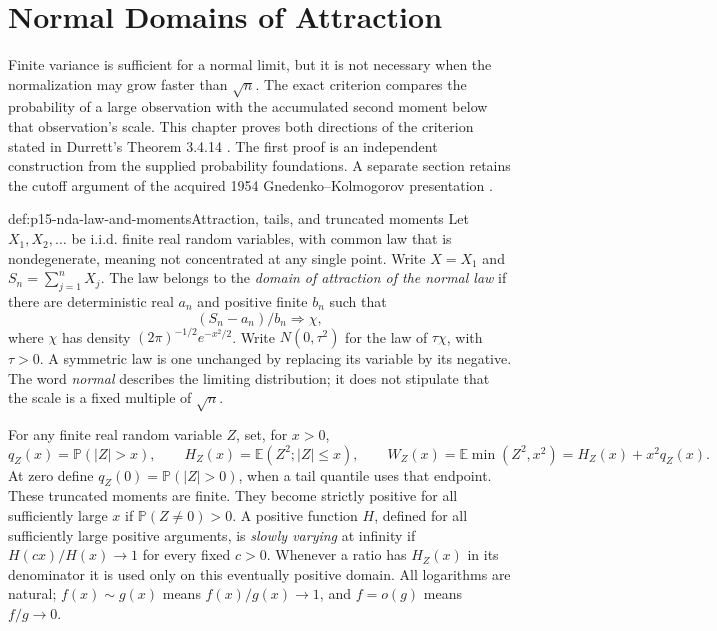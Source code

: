\chapter{Normal Domains of Attraction}
\label{sec:p15-normal-domains-of-attraction}

Finite variance is sufficient for a normal limit, but it is not
necessary when the normalization may grow faster than \(\sqrt n\).
The exact criterion compares the probability of a large observation
with the accumulated second moment below that observation's scale.
This chapter proves both directions of the criterion stated in
Durrett's Theorem 3.4.14
\cite[p.~152]{DurrettPTEAuthor2019}.
The first proof is an independent construction from the supplied
probability foundations. A separate section retains the cutoff
argument of the acquired 1954 Gnedenko--Kolmogorov presentation
\cite[Section~35, Theorem~1, pp.~172--175]{GnedenkoKolmogorov1954LimitDistributions}.

\begin{hbdefinition}{def:p15-nda-law-and-moments}{Attraction, tails, and truncated moments}
Let \(X_1,X_2,\ldots\) be i.i.d. finite real random variables,
with common law that is nondegenerate, meaning not concentrated
at any single point. Write \(X=X_1\) and
\(S_n=\sum_{j=1}^nX_j\).
The law belongs to the \emph{domain of attraction of the normal law}
if there are deterministic real \(a_n\) and positive finite \(b_n\)
such that
\[
 (S_n-a_n)/b_n\Rightarrow\chi,
 \]
where \(\chi\) has density
\((2\pi)^{-1/2}e^{-x^2/2}\).
Write \(N(0,\tau^2)\) for the law of \(\tau\chi\), with
\(\tau>0\). A symmetric law is one unchanged by replacing
its variable by its negative.
The word \emph{normal} describes the limiting distribution; it does
not stipulate that the scale is a fixed multiple of \(\sqrt n\).

For any finite real random variable \(Z\), set, for \(x>0\),
\[
 q_Z(x)=\mathbb P(|Z|>x),\qquad
 H_Z(x)=\mathbb E(Z^2;|Z|\leq x),\qquad
 W_Z(x)=\mathbb E\min(Z^2,x^2)=H_Z(x)+x^2q_Z(x).
 \]
At zero define \(q_Z(0)=\mathbb P(|Z|>0)\), when a tail
quantile uses that endpoint.
These truncated moments are finite. They become strictly positive
for all sufficiently large \(x\) if \(\mathbb P(Z\ne0)>0\).
A positive function \(H\), defined for all sufficiently large
positive arguments, is \emph{slowly varying} at infinity if
\(H(cx)/H(x)\to1\) for every fixed \(c>0\).
Whenever a ratio has \(H_Z(x)\) in its denominator it is used
only on this eventually positive domain.
All logarithms are natural; \(f(x)\sim g(x)\) means
\(f(x)/g(x)\to1\), and \(f=o(g)\) means \(f/g\to0\).
\end{hbdefinition}

